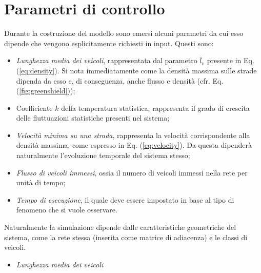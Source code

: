 \documentclass[../main.tex]{subfiles}
\begin{document}
\section{Parametri di controllo}
Durante la costruzione del modello sono emersi alcuni parametri da cui esso dipende che vengono esplicitamente richiesti in input.
Questi sono:
\begin{itemize}
    \item \emph{Lunghezza media dei veicoli}, rappresentata dal parametro $\bar{l}_v$ presente in Eq. (\ref{eq:density}).
        Si nota immediatamente come la densit\`a massima sulle strade dipenda da esso e, di conseguenza, anche flusso e densit\`a (cfr. Eq. (\ref{fig:greenshield}));
    \item Coefficiente $k$ della temperatura statistica, rappresenta il grado di crescita delle fluttuazioni statistiche presenti nel sistema;
    \item \emph{Velocit\`a minima su una strada}, rappresenta la velocit\`a corrispondente alla densit\`a massima, come espresso in Eq. (\ref{eq:velocity}).
        Da questa dipender\`a naturalmente l'evoluzione temporale del sistema stesso;
    \item \emph{Flusso di veicoli immessi}, ossia il numero di veicoli immessi nella rete per unit\`a di tempo;
    \item \emph{Tempo di esecuzione}, il quale deve essere impostato in base al tipo di fenomeno che si vuole osservare.
\end{itemize}
Naturalmente la simulazione dipende dalle caratteristiche geometriche del sistema, come la rete stessa (inserita come matrice di adiacenza) e le classi di veicoli.

\begin{itemize}
    \item \emph{Lunghezza media dei veicoli}
\end{itemize}
\end{document}
